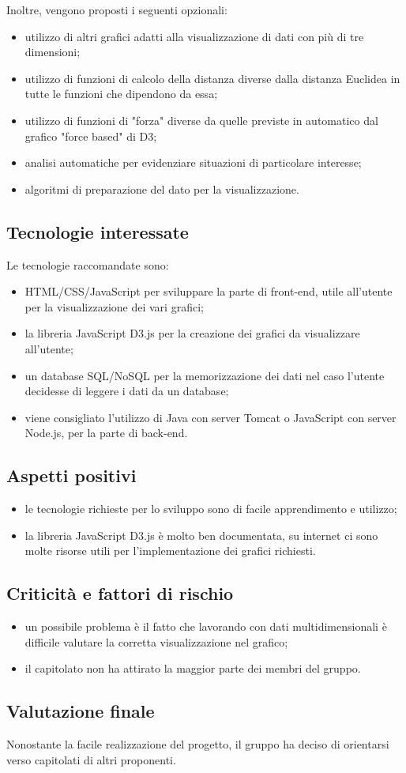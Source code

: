 Inoltre, vengono proposti i seguenti  opzionali:
\begin{itemize}
\item utilizzo di altri grafici adatti alla visualizzazione di dati con più di tre dimensioni;
\item utilizzo di funzioni di calcolo della distanza diverse dalla distanza Euclidea in tutte le funzioni che dipendono da essa;
\item utilizzo di funzioni di "forza" diverse da quelle previste in automatico dal grafico "force based" di D3;
\item analisi automatiche per evidenziare situazioni di particolare interesse;
\item algoritmi di preparazione del dato per la visualizzazione.
\end{itemize}

\subsection{Tecnologie interessate}
Le tecnologie raccomandate sono:
\begin{itemize}
\item HTML/CSS/JavaScript per sviluppare la parte di front-end, utile all'utente per la visualizzazione dei vari grafici;
\item la libreria JavaScript D3.js per la creazione dei grafici da visualizzare all'utente;
\item un database SQL/NoSQL per la memorizzazione dei dati nel caso l'utente decidesse di leggere i dati da un database;
\item viene consigliato l’utilizzo di Java con server Tomcat o JavaScript con server Node.js, per la parte di back-end.
\end{itemize}

\subsection{Aspetti positivi}
\begin{itemize}
\item le tecnologie richieste per lo sviluppo sono di facile apprendimento e utilizzo;
\item la libreria JavaScript D3.js è molto ben documentata, su internet ci sono molte risorse utili per l'implementazione dei grafici richiesti.
\end{itemize}

\subsection{Criticità e fattori di rischio}
\begin{itemize}
\item un possibile problema è il fatto che lavorando con dati multidimensionali è difficile valutare la corretta visualizzazione nel grafico;
\item il capitolato non ha attirato la maggior parte dei membri del gruppo.
\end{itemize}

\subsection{Valutazione finale}
Nonostante la facile realizzazione del progetto, il gruppo ha deciso di orientarsi verso capitolati di altri proponenti.